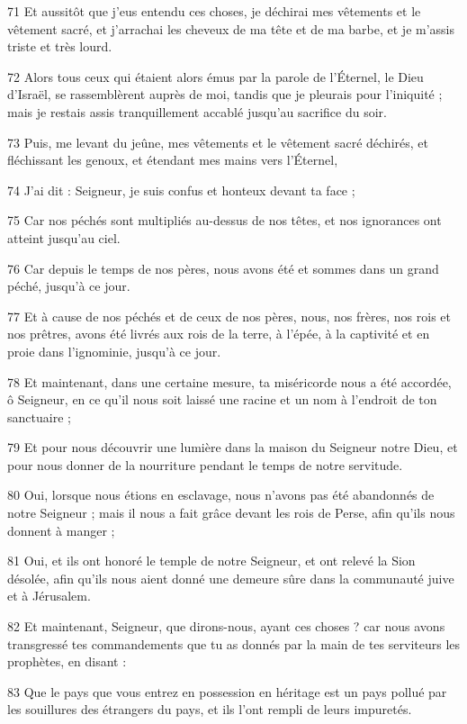 \par 71 Et aussitôt que j'eus entendu ces choses, je déchirai mes vêtements et le vêtement sacré, et j'arrachai les cheveux de ma tête et de ma barbe, et je m'assis triste et très lourd.
\par 72 Alors tous ceux qui étaient alors émus par la parole de l'Éternel, le Dieu d'Israël, se rassemblèrent auprès de moi, tandis que je pleurais pour l'iniquité ; mais je restais assis tranquillement accablé jusqu'au sacrifice du soir.
\par 73 Puis, me levant du jeûne, mes vêtements et le vêtement sacré déchirés, et fléchissant les genoux, et étendant mes mains vers l'Éternel,
\par 74 J'ai dit : Seigneur, je suis confus et honteux devant ta face ;
\par 75 Car nos péchés sont multipliés au-dessus de nos têtes, et nos ignorances ont atteint jusqu'au ciel.
\par 76 Car depuis le temps de nos pères, nous avons été et sommes dans un grand péché, jusqu'à ce jour.
\par 77 Et à cause de nos péchés et de ceux de nos pères, nous, nos frères, nos rois et nos prêtres, avons été livrés aux rois de la terre, à l'épée, à la captivité et en proie dans l'ignominie, jusqu'à ce jour.
\par 78 Et maintenant, dans une certaine mesure, ta miséricorde nous a été accordée, ô Seigneur, en ce qu'il nous soit laissé une racine et un nom à l'endroit de ton sanctuaire ;
\par 79 Et pour nous découvrir une lumière dans la maison du Seigneur notre Dieu, et pour nous donner de la nourriture pendant le temps de notre servitude.
\par 80 Oui, lorsque nous étions en esclavage, nous n'avons pas été abandonnés de notre Seigneur ; mais il nous a fait grâce devant les rois de Perse, afin qu'ils nous donnent à manger ;
\par 81 Oui, et ils ont honoré le temple de notre Seigneur, et ont relevé la Sion désolée, afin qu'ils nous aient donné une demeure sûre dans la communauté juive et à Jérusalem.
\par 82 Et maintenant, Seigneur, que dirons-nous, ayant ces choses ? car nous avons transgressé tes commandements que tu as donnés par la main de tes serviteurs les prophètes, en disant :
\par 83 Que le pays que vous entrez en possession en héritage est un pays pollué par les souillures des étrangers du pays, et ils l'ont rempli de leurs impuretés.
